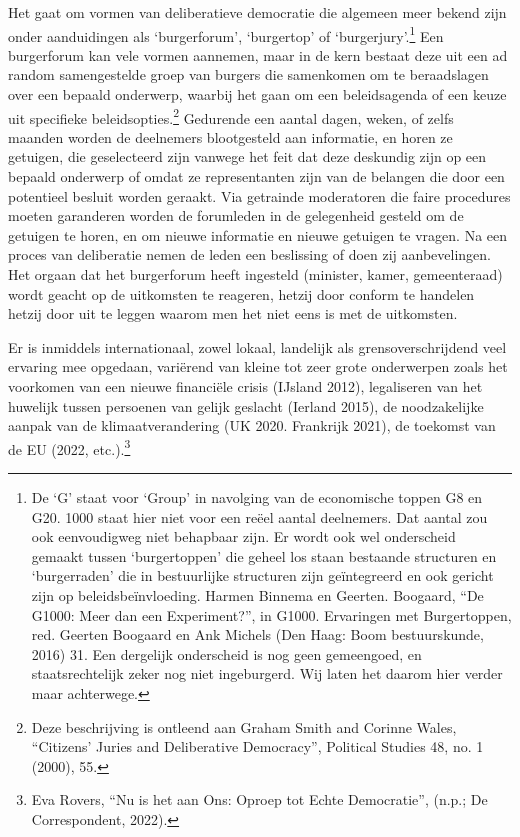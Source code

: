 \documentclass{jote-book}
\begin{document}
	Het gaat om vormen van deliberatieve democratie die algemeen meer bekend zijn onder aanduidingen als ‘burgerforum', ‘burgertop' of ‘burgerjury'.\footnote{De ‘G' staat voor ‘Group' in navolging van de economische toppen G8 en G20. 1000 staat hier niet voor een reëel aantal deelnemers. Dat aantal zou ook eenvoudigweg niet behapbaar zijn. Er wordt ook wel onderscheid gemaakt tussen ‘burgertoppen' die geheel los staan bestaande structuren en ‘burgerraden' die in bestuurlijke structuren zijn geïntegreerd en ook gericht zijn op beleidsbeïnvloeding. Harmen Binnema en Geerten. Boogaard, “De G1000: Meer dan een Experiment?”, in G1000. Ervaringen met Burgertoppen, red. Geerten Boogaard en Ank Michels (Den Haag: Boom bestuurskunde, 2016) 31. Een dergelijk onderscheid is nog geen gemeengoed, en staatsrechtelijk zeker nog niet ingeburgerd. Wij laten het daarom hier verder maar achterwege.} Een burgerforum kan vele vormen aannemen, maar in de kern bestaat deze uit een ad random samengestelde groep van burgers die samenkomen om te beraadslagen over een bepaald onderwerp, waarbij het gaan om een beleidsagenda of een keuze uit specifieke beleidsopties.\footnote{Deze beschrijving is ontleend aan Graham Smith and Corinne Wales, “Citizens' Juries and Deliberative Democracy”, Political Studies 48, no. 1 (2000), 55.} Gedurende een aantal dagen, weken, of zelfs maanden worden de deelnemers blootgesteld aan informatie, en horen ze getuigen, die geselecteerd zijn vanwege het feit dat deze deskundig zijn op een bepaald onderwerp of omdat ze representanten zijn van de belangen die door een potentieel besluit worden geraakt. Via getrainde moderatoren die faire procedures moeten garanderen worden de forumleden in de gelegenheid gesteld om de getuigen te horen, en om nieuwe informatie en nieuwe getuigen te vragen. Na een proces van deliberatie nemen de leden een beslissing of doen zij aanbevelingen. Het orgaan dat het burgerforum heeft ingesteld (minister, kamer, gemeenteraad) wordt geacht op de uitkomsten te reageren, hetzij door conform te handelen hetzij door uit te leggen waarom men het niet eens is met de uitkomsten.



	Er is inmiddels internationaal, zowel lokaal, landelijk als grensoverschrijdend veel ervaring mee opgedaan, variërend van kleine tot zeer grote onderwerpen zoals het voorkomen van een nieuwe financiële crisis (IJsland 2012), legaliseren van het huwelijk tussen persoenen van gelijk geslacht (Ierland 2015), de noodzakelijke aanpak van de klimaatverandering (UK 2020. Frankrijk 2021), de toekomst van de EU (2022, etc.).\footnote{Eva Rovers, “Nu is het aan Ons: Oproep tot Echte Democratie”, (n.p.; De Correspondent, 2022).}
\end{document}
